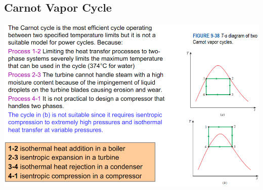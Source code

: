 \documentclass{article}
\begin{document}
\begin{multicols}{3}
    \subsection*{Carnot Vapor Cycle}
    \includegraphics[width=\linewidth]{Images/carnot_vapor.png}

\end{multicols}
\end{document}
